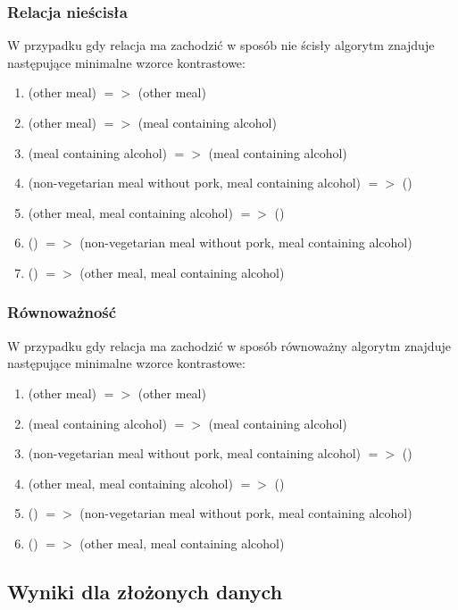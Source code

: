 \documentclass[a4paper,12pt]{article}
\begin{document}
\subsubsection{Relacja nieścisła}

W przypadku gdy relacja ma zachodzić w sposób nie ścisły algorytm znajduje następujące minimalne wzorce kontrastowe:

\begin{enumerate}
\item (other meal) $=>$ (other meal)
\item (other meal) $=>$ (meal containing alcohol)
\item (meal containing alcohol) $=>$ (meal containing alcohol)
\item (non-vegetarian meal without pork, meal containing alcohol) $=>$ ()
\item (other meal, meal containing alcohol) $=>$ ()
\item () $=>$ (non-vegetarian meal without pork, meal containing alcohol)
\item () $=>$ (other meal, meal containing alcohol)
\end{enumerate}

\subsubsection{Równoważność}

W przypadku gdy relacja ma zachodzić w sposób równoważny algorytm znajduje następujące minimalne wzorce kontrastowe:

\begin{enumerate}
\item (other meal) $=>$ (other meal)
\item (meal containing alcohol) $=>$ (meal containing alcohol)
\item (non-vegetarian meal without pork, meal containing alcohol) $=>$ ()
\item (other meal, meal containing alcohol) $=>$ ()
\item () $=>$ (non-vegetarian meal without pork, meal containing alcohol)
\item () $=>$ (other meal, meal containing alcohol)
\end{enumerate}

\subsection{Wyniki dla złożonych danych}
\end{document}
